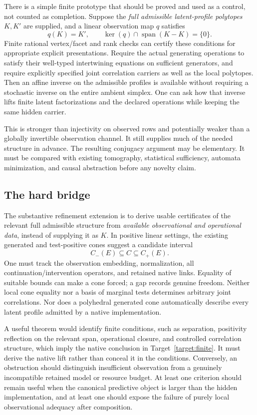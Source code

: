 \documentclass[11pt]{article}
\theoremstyle{remark}
\newcommand{\spanlin}{\operatorname{span}}
\begin{document}
There is a simple finite prototype that should be proved and used as a control, not counted as completion. Suppose the \emph{full admissible latent-profile polytopes} $K,K'$ are supplied, and a linear observation map $q$ satisfies
\begin{equation}
 q(K)=K',\qquad
 \ker(q)\cap\spanlin(K-K)=\{0\}.
 \label{eq:polytope-iso}
\end{equation}
Finite rational vertex/facet and rank checks can certify these conditions for appropriate explicit presentations. Require the actual generating operations to satisfy their well-typed intertwining equations on sufficient generators, and require explicitly specified joint correlation carriers as well as the local polytopes. Then an affine inverse on the admissible profiles is available without requiring a stochastic inverse on the entire ambient simplex. One can ask how that inverse lifts finite latent factorizations and the declared operations while keeping the same hidden carrier.

This is stronger than injectivity on observed rows and potentially weaker than a globally invertible observation channel. It still supplies much of the needed structure in advance. The resulting conjugacy argument may be elementary. It must be compared with existing tomography, statistical sufficiency, automata minimization, and causal abstraction before any novelty claim.

\subsection{The hard bridge}

The substantive refinement extension is to derive usable certificates of the relevant full admissible structure from \emph{available observational and operational data}, instead of supplying it as $K$. In positive linear settings, the existing generated and test-positive cones suggest a candidate interval
\[
 C_-(E)\subseteq C\subseteq C_+(E).
\]
One must track the observation embedding, normalization, all continuation/intervention operators, and retained native links. Equality of suitable bounds can make a cone forced; a gap records genuine freedom. Neither local cone equality nor a basis of marginal tests determines arbitrary joint correlations. Nor does a polyhedral generated cone automatically describe every latent profile admitted by a native implementation.

A useful theorem would identify finite conditions, such as separation, positivity reflection on the relevant span, operational closure, and controlled correlation structure, which imply the native conclusion in Target~\ref{target:finite}. It must derive the native lift rather than conceal it in the conditions. Conversely, an obstruction should distinguish insufficient observation from a genuinely incompatible retained model or resource budget. At least one criterion should remain useful when the canonical predictive object is larger than the hidden implementation, and at least one should expose the failure of purely local observational adequacy after composition.
\end{document}

